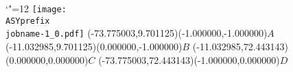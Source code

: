 \setlength{\unitlength}{1pt}
\makeatletter%
\let\ASYencoding\f@encoding%
\let\ASYfamily\f@family%
\let\ASYseries\f@series%
\let\ASYshape\f@shape%
\makeatother%
{\catcode`"=12%
\texttt{[image: \\ASYprefix\\jobname-1\_0.pdf]}%
}%
\color{ASYcolor}
\fontsize{12.000000}{14.400000}\selectfont
\usefont{\ASYencoding}{\ASYfamily}{\ASYseries}{\ASYshape}%
\ASYalign(-73.775003,9.701125)(-1.000000,-1.000000){$A$}
\color{ASYcolor}
\fontsize{12.000000}{14.400000}\selectfont
\ASYalign(-11.032985,9.701125)(0.000000,-1.000000){$B$}
\color{ASYcolor}
\fontsize{12.000000}{14.400000}\selectfont
\ASYalign(-11.032985,72.443143)(0.000000,0.000000){$C$}
\color{ASYcolor}
\fontsize{12.000000}{14.400000}\selectfont
\ASYalign(-73.775003,72.443143)(-1.000000,0.000000){$D$}
